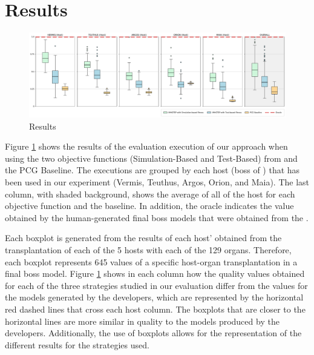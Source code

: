 \section{Results}
\label{sec:Results}

\begin{figure}
    \centering
    \includegraphics[width=\textwidth]{Figures/Imhotep_with_legend_and_oracle_average-v4.pdf}
    \caption{Results}
    \label{fig:results}
\end{figure}

Figure \ref{fig:results} shows the results of the evaluation execution of our approach when using the two objective functions (Simulation-Based and Test-Based) from \ApproachName{} and the PCG Baseline. The executions are grouped by each host (boss of \CaseStudy{}) that has been used in our experiment (Vermis, Teuthus, Argos, Orion, and Maia). The last column, with shaded background, shows the average of all of the host for each objective function and the baseline. In addition, the oracle indicates the value obtained by the human-generated final boss models that were obtained from the \CaseStudy{}. 

Each boxplot is generated from the results of each host' obtained from the transplantation of each of the 5 hosts with each of the 129 organs. Therefore, each boxplot represents 645 values of a specific host-organ transplantation in a final boss model. Figure \ref{fig:results} shows in each column how the quality values obtained for each of the three strategies studied in our evaluation differ from the values for the models generated by the developers, which are represented by the horizontal red dashed lines that cross each host column. The boxplots that are closer to the horizontal lines are more similar in quality to the models produced by the developers. Additionally, the use of boxplots allows for the representation of the different results for the strategies used.



